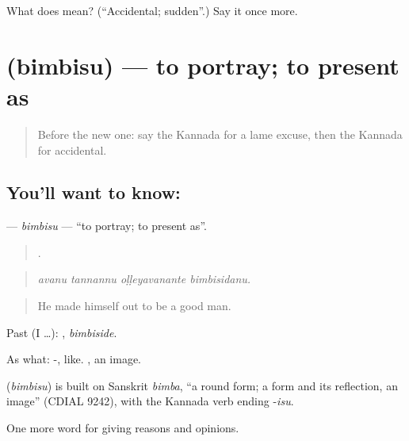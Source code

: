\begin{tcolorbox}[breakable,colback=teal!4,colframe=teal!35!black,title={Before you move on}]
What does  mean? (\textquotedblleft{}Accidental; sudden\textquotedblright{}.) Say it once more.
\end{tcolorbox}
\section[\texorpdfstring{\kn{ಬಿಂಬಿಸು} (bimbisu)}{ಬಿಂಬಿಸು (bimbisu)}]{ (bimbisu) — to portray; to present as}

\label{lesson:KA-C386-bimbisu}



\begin{quote}
Before the new one: say the Kannada for a lame excuse, then the Kannada for accidental.
\end{quote}

\subsection*{You'll want to know: }
\textbf{} — \emph{bimbisu} — \textquotedblleft{}to portray; to present as\textquotedblright{}.

\begin{quote}
   .
\end{quote}

\begin{quote}
\emph{avanu tannannu oḷḷeyavanante bimbisidanu.}
\end{quote}

\begin{quote}
He made himself out to be a good man.
\end{quote}

Past (I …): , \emph{bimbiside}.

As what: -, like. , an image.

\begin{cousinweb}
\textbf{} (\emph{bimbisu}) is built on Sanskrit \emph{bimba}, \textquotedblleft{}a round form; a form and its reflection, an image\textquotedblright{} (CDIAL 9242), with the Kannada verb ending -\emph{isu}.
\end{cousinweb}

\begin{grammarlens}[title={What you've built}]
One more word for giving reasons and opinions.
\end{grammarlens}

